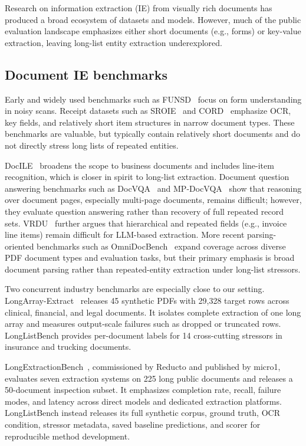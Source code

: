 Research on information extraction (IE) from visually rich documents has produced a broad ecosystem of datasets and models. However, much of the public evaluation landscape emphasizes either short documents (e.g., forms) or key-value extraction, leaving long-list entity extraction underexplored.

\subsection{Document IE benchmarks}
Early and widely used benchmarks such as FUNSD~\cite{jaume2019funsd} focus on form understanding in noisy scans. Receipt datasets such as SROIE~\cite{huang2021sroie} and CORD~\cite{park2019cord} emphasize OCR, key fields, and relatively short item structures in narrow document types. These benchmarks are valuable, but typically contain relatively short documents and do not directly stress long lists of repeated entities.

DocILE~\cite{simsa2023docile} broadens the scope to business documents and includes line-item recognition, which is closer in spirit to long-list extraction. Document question answering benchmarks such as DocVQA~\cite{mathew2021docvqa} and MP-DocVQA~\cite{tito2022mpdocvqa} show that reasoning over document pages, especially multi-page documents, remains difficult; however, they evaluate question answering rather than recovery of full repeated record sets. VRDU~\cite{wang2023vrdu} further argues that hierarchical and repeated fields (e.g., invoice line items) remain difficult for LLM-based extraction. More recent parsing-oriented benchmarks such as OmniDocBench~\cite{ouyang2024omnidocbench} expand coverage across diverse PDF document types and evaluation tasks, but their primary emphasis is broad document parsing rather than repeated-entity extraction under long-list stressors.

Two concurrent industry benchmarks are especially close to our setting. LongArray-Extract~\cite{reyhan2026longarrayextract} releases 45 synthetic PDFs with 29{,}328 target rows across clinical, financial, and legal documents. It isolates complete extraction of one long array and measures output-scale failures such as dropped or truncated rows. LongListBench provides per-document labels for 14 cross-cutting stressors in insurance and trucking documents.

LongExtractionBench~\cite{micro1longextractbench2026}, commissioned by Reducto and published by micro1, evaluates seven extraction systems on 225 long public documents and releases a 50-document inspection subset. It emphasizes completion rate, recall, failure modes, and latency across direct models and dedicated extraction platforms. LongListBench instead releases its full synthetic corpus, ground truth, OCR condition, stressor metadata, saved baseline predictions, and scorer for reproducible method development.

